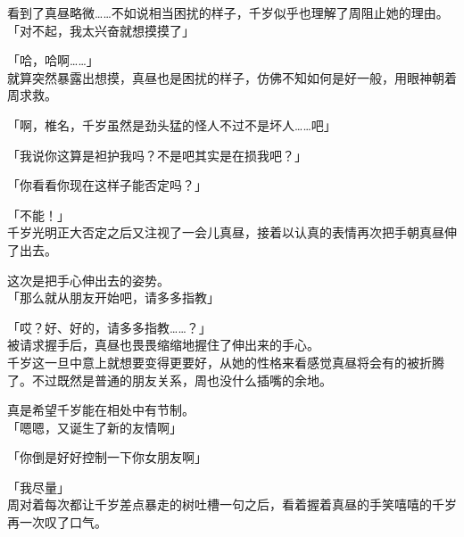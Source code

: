 看到了真昼略微……不如说相当困扰的样子，千岁似乎也理解了周阻止她的理由。\\

「对不起，我太兴奋就想摸摸了」

「哈，哈啊……」\\

就算突然暴露出想摸，真昼也是困扰的样子，仿佛不知如何是好一般，用眼神朝着周求救。

「啊，椎名，千岁虽然是劲头猛的怪人不过不是坏人……吧」

「我说你这算是袒护我吗？不是吧其实是在损我吧？」

「你看看你现在这样子能否定吗？」

「不能！」\\

千岁光明正大否定之后又注视了一会儿真昼，接着以认真的表情再次把手朝真昼伸了出去。

这次是把手心伸出去的姿势。\\

「那么就从朋友开始吧，请多多指教」

「哎？好、好的，请多多指教……？」\\

被请求握手后，真昼也畏畏缩缩地握住了伸出来的手心。\\

千岁这一旦中意上就想要变得更要好，从她的性格来看感觉真昼将会有的被折腾了。不过既然是普通的朋友关系，周也没什么插嘴的余地。

真是希望千岁能在相处中有节制。\\

「嗯嗯，又诞生了新的友情啊」

「你倒是好好控制一下你女朋友啊」

「我尽量」\\

周对着每次都让千岁差点暴走的树吐槽一句之后，看着握着真昼的手笑嘻嘻的千岁再一次叹了口气。\\
